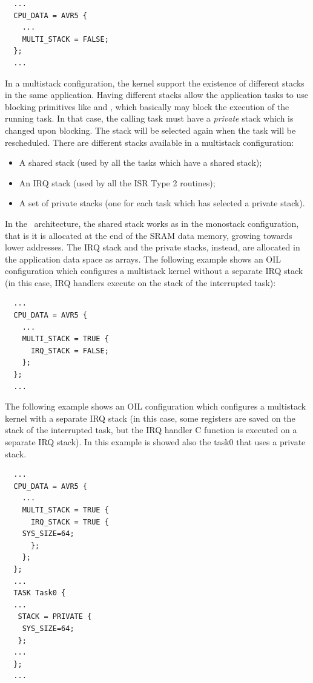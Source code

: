 \begin{lstlisting}
  ...
  CPU_DATA = AVR5 {
    ...
    MULTI_STACK = FALSE;
  };
  ...
\end{lstlisting}


In a multistack configuration, the kernel support the existence of
different stacks in the same application. Having different stacks
allow the application tasks to use blocking primitives like
 and , which basically may block the
execution of the running task. In that case, the calling task must have
a {\em private} stack which is changed upon blocking. The stack will
be selected again when the task will be rescheduled. There are
different stacks available in a multistack configuration:
\begin{itemize}
\item A shared stack (used by all the tasks which have a shared
  stack);
\item An IRQ stack (used by all the ISR Type 2 routines);
\item A set of private stacks (one for each task which has selected a
  private stack).
\end{itemize}

In the \avr\ architecture, the shared stack works as in the monostack
configuration, that is it is allocated at the end of the SRAM data memory, 
growing towards lower addresses. The IRQ stack and the private stacks, instead,
are allocated in the application data space as arrays.
The following example shows an OIL configuration which configures a
multistack kernel without a separate IRQ stack (in this case, IRQ
handlers execute on the stack of the interrupted task):

\begin{lstlisting}
  ...
  CPU_DATA = AVR5 {
    ...
    MULTI_STACK = TRUE {
      IRQ_STACK = FALSE;
    };
  };
  ...
\end{lstlisting}
The following example shows an OIL configuration which configures a
multistack kernel with a separate IRQ stack (in this case, some
registers are saved on the stack of the interrupted task, but the IRQ
handler C function is executed on a separate IRQ stack).
In this example is showed also the task0 that uses a private stack.

\begin{lstlisting}
  ...
  CPU_DATA = AVR5 {
    ...
    MULTI_STACK = TRUE {
      IRQ_STACK = TRUE {
	SYS_SIZE=64;
      };
    };
  };
  ...
  TASK Task0 {
  ...
   STACK = PRIVATE {
   	SYS_SIZE=64;
   };
  ...		   
  };
  ...
\end{lstlisting}

